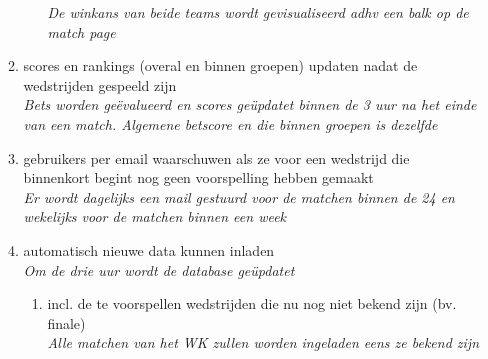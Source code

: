 \documentclass[11pt, a4paper]{article}
\begin{document}
\begin{enumerate}
\begin{enumerate}
\begin{enumerate}
\textit{De winkans van beide teams wordt gevisualiseerd adhv een balk op de match page}
\end{enumerate}
\item scores en rankings (overal en binnen groepen) updaten nadat de wedstrijden gespeeld zijn \\
\textit{Bets worden ge\"evalueerd en scores ge\"updatet binnen de 3 uur na het einde van een match. Algemene betscore en die binnen groepen is dezelfde}
\item gebruikers per email waarschuwen als ze voor een wedstrijd die binnenkort begint nog geen voorspelling hebben gemaakt \\
\textit{Er wordt dagelijks een mail gestuurd voor de matchen binnen de 24 en wekelijks voor de matchen binnen een week}
\item automatisch nieuwe data kunnen inladen \\
\textit{Om de drie uur wordt de database ge\"updatet}
\begin{enumerate}
\item incl. de te voorspellen wedstrijden die nu nog niet bekend zijn (bv. finale) \\
\textit{Alle matchen van het WK zullen worden ingeladen eens ze bekend zijn}
\end{enumerate}
\end{enumerate}
\end{enumerate}


\end{document}
